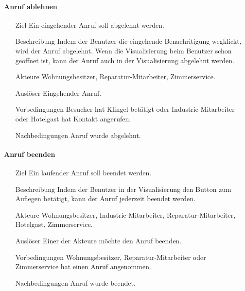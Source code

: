 \paragraph{Anruf ablehnen}
    \begin{itemize}
        \item[Ziel]
        Ein eingehender Anruf soll abgelehnt werden.
        \item[Beschreibung]
        Indem der Benutzer die eingehende Benachritigung wegklickt, wird der Anruf abgelehnt.
        Wenn die Visualisierung beim Benutzer schon geöffnet ist, kann der Anruf auch in der Visualisierung abgelehnt werden.
        \item[Akteure]
        Wohnungsbesitzer, Reparatur-Mitarbeiter, Zimmerservice.
        \item[Auslöser]
        Eingehender Anruf.
        \item[Vorbedingungen]
        Besucher hat Klingel betätigt oder Industrie-Mitarbeiter oder Hotelgast hat Kontakt angerufen.
        \item[Nachbedingungen]
        Anruf wurde abgelehnt.
        \end{itemize}

\paragraph{Anruf beenden}
    \begin{itemize}
        \item[Ziel]
        Ein laufender Anruf soll beendet werden.
        \item[Beschreibung]
        Indem der Benutzer in der Visualisierung den Button zum Auflegen betätigt, kann der Anruf jederzeit beendet werden.
        \item[Akteure]
        Wohnungsbesitzer, Industrie-Mitarbeiter, Reparatur-Mitarbeiter, Hotelgast, Zimmerservice.
        \item[Auslöser]
        Einer der Akteure möchte den Anruf beenden.
        \item[Vorbedingungen]
        Wohnungsbesitzer, Reparatur-Mitarbeiter oder Zimmerservice hat einen Anruf angenommen.
        \item[Nachbedingungen]
        Anruf wurde beendet.
        \end{itemize}

